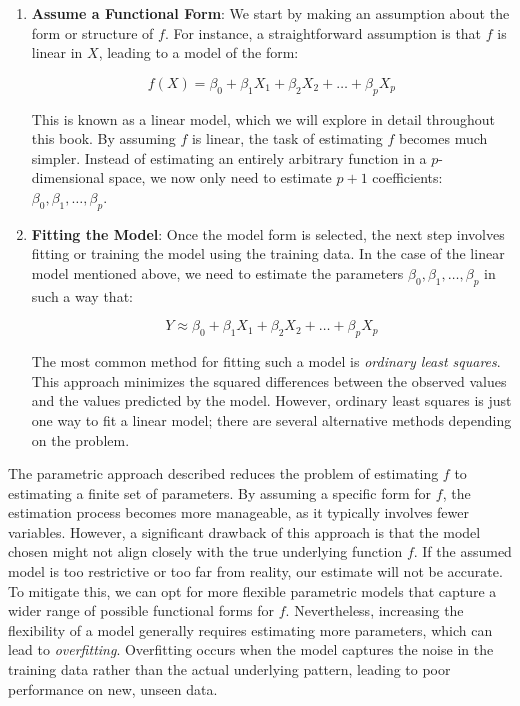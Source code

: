 \begin{enumerate}
    \item \textbf{Assume a Functional Form}: We start by making an assumption about the form or structure of $f$. For instance, a straightforward assumption is that $f$ is linear in $X$, leading to a model of the form:

    \[
    f(X) = \beta_0 + \beta_1 X_1 + \beta_2 X_2 + \ldots + \beta_p X_p
    \]

    This is known as a linear model, which we will explore in detail throughout this book. By assuming $f$ is linear, the task of estimating $f$ becomes much simpler. Instead of estimating an entirely arbitrary function in a $p$-dimensional space, we now only need to estimate $p + 1$ coefficients: $\beta_0, \beta_1, \ldots, \beta_p$.

    \item \textbf{Fitting the Model}: Once the model form is selected, the next step involves fitting or training the model using the training data. In the case of the linear model mentioned above, we need to estimate the parameters $\beta_0, \beta_1, \ldots, \beta_p$ in such a way that:

    \[
    Y \approx \beta_0 + \beta_1 X_1 + \beta_2 X_2 + \ldots + \beta_p X_p
    \]

    The most common method for fitting such a model is \textit{ordinary least squares}. This approach minimizes the squared differences between the observed values and the values predicted by the model. However, ordinary least squares is just one way to fit a linear model; there are several alternative methods depending on the problem.
\end{enumerate}

The parametric approach described reduces the problem of estimating $f$ to estimating a finite set of parameters. By assuming a specific form for $f$, the estimation process becomes more manageable, as it typically involves fewer variables. However, a significant drawback of this approach is that the model chosen might not align closely with the true underlying function $f$. If the assumed model is too restrictive or too far from reality, our estimate will not be accurate. To mitigate this, we can opt for more flexible parametric models that capture a wider range of possible functional forms for $f$. Nevertheless, increasing the flexibility of a model generally requires estimating more parameters, which can lead to \textit{overfitting}. Overfitting occurs when the model captures the noise in the training data rather than the actual underlying pattern, leading to poor performance on new, unseen data.

